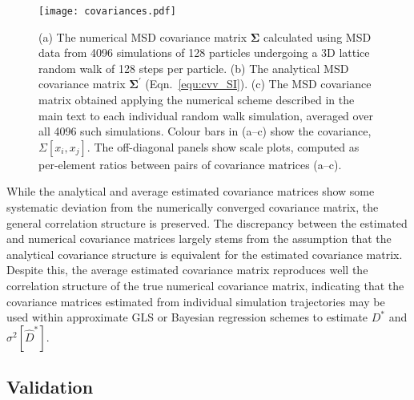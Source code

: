 \documentclass[reprint,superscriptaddress,nobibnotes,amsmath,amssymb,aps,prx,hidelinks,linenumbers]{revtex4-2}
\newcommand{\oMSDi}{\ensuremath{x_i}}
\newcommand{\oMSDj}{\ensuremath{x_j}}
\newcommand{\Dest}{\ensuremath{\widehat{D}^*}}
\newcommand{\D}{\ensuremath{D^*}}
\newcommand{\var}[1]{\ensuremath{\sigma^2[#1]}}
\begin{document}
\begin{figure}
    \centering
    \texttt{[image: covariances.pdf]}
    \caption{
        (a) The numerical MSD covariance matrix $\bm{\Sigma}$ calculated using MSD data from \num{4096} simulations of \num{128} particles undergoing a 3D lattice random walk of \num{128} steps per particle.
        (b) The analytical MSD covariance matrix $\bm{\Sigma^\prime}$ (Eqn.~\ref{equ:cvv_SI}).
        (c) The MSD covariance matrix obtained applying the numerical scheme described in the main text to each individual random walk simulation, averaged over all \num{4096} such simulations.
        Colour bars in (a--c) show the covariance, $\Sigma\left[\oMSDi, \oMSDj\right]$.
        The off-diagonal panels show scale plots, computed as per-element ratios between pairs of covariance matrices (a--c).
    }
    \label{fig:covariances}
\end{figure}

While the analytical and average estimated covariance matrices show some systematic deviation from the numerically converged covariance matrix, the general correlation structure is preserved.
The discrepancy between the estimated and numerical covariance matrices largely stems from the assumption that the analytical covariance structure is equivalent for the estimated covariance matrix. 
Despite this, the average estimated covariance matrix reproduces well the correlation structure of the true numerical covariance matrix, indicating that the covariance matrices estimated from individual simulation trajectories may be used within approximate GLS or Bayesian regression schemes to estimate $\D$ and $\var{\Dest}$.

\subsection{Validation}
\end{document}

